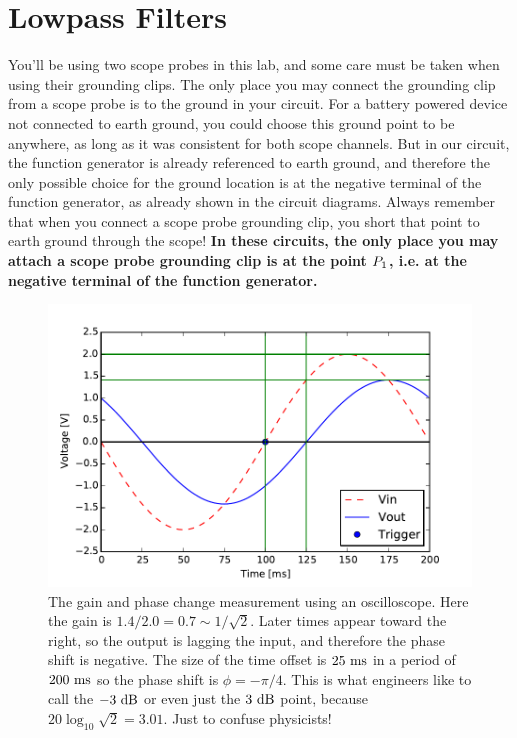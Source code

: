 \section{Lowpass Filters}


\noindent
You'll be using two scope probes in this lab, and some care must be taken when using their grounding clips.  The only place you may connect the grounding clip from a scope probe is to the ground in your circuit. For a battery powered device not connected to earth ground, you could choose this ground point to be anywhere, as long as it was consistent for both scope channels.  But in our circuit, the function generator is already referenced to earth ground, and therefore the only possible choice for the ground location is at the negative terminal of the function generator, as already shown in the circuit diagrams.  Always remember that when you connect a scope probe grounding clip, you short that point to earth ground through the scope!  {\bf In these circuits, the only place you may attach a scope probe grounding clip is at the point $\boldmath P_1$, i.e. at the negative terminal of the function generator.}


\begin{figure}[htbp]
\begin{center}
\includegraphics[height=0.35\textheight]{figs/labs/filters/scope_gain.pdf}
\end{center}
\caption{\label{fig:scopegain} The gain and phase change measurement using an oscilloscope.
Here the gain is $1.4/2.0 = 0.7 \sim 1/\sqrt{2}$.  Later times appear toward the right, so the output is lagging the input, and therefore the phase shift is negative.  The size of the time offset is $25~\rm ms$ in a period of $200~\rm ms$ so the phase shift is $\phi = -\pi/4$.  This is what engineers like to call the $-3~\rm dB$ or even just the $3~\rm dB$ point, because $20 \log_{10} \sqrt{2} = 3.01$.  Just to confuse physicists!}
\end{figure}

